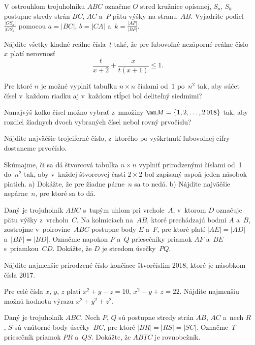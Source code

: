 {%
V ostrouhlom trojuholníku $ABC$ označme $O$ stred
kružnice opísanej, $S_a$, $S_b$ postupne stredy strán $BC$, $AC$
a~$P$ pätu výšky na stranu~$AB$. Vyjadrite podiel $\frac{|OS_a|}{|OS_b|}$
pomocou $a=|BC|$, $ b=|CA|$ a~$k=\frac{|AP|}{|BP|}$.}

{%
Nájdite všetky kladné reálne čísla~$t$ také, že pre
ľubovoľné nezáporné reálne číslo~$x$ platí nerovnosť
$$
\frac t{x+2}+\frac x{t(x+1)}\le 1.
$$}

{%
Pre ktoré $n$ je možné vyplniť tabuľku $n\times n$ číslami od~$1$ po~$n^2$
tak, aby súčet čísel v~každom riadku aj v~každom stĺpci bol deliteľný siedmimi?}

{%
Nanajvýš koľko čísel možno vybrať z~množiny
$\mn M=\{1,2,\dots,2\,018\}$ tak, aby rozdiel žiadnych dvoch vybraných čísel
nebol rovný prvočíslu?}

{%
Nájdite najväčšie trojciferné číslo, z~ktorého po vyškrtnutí
ľubovoľnej cifry dostaneme prvočíslo.}

{%
Skúmajme, či sa dá štvorcová tabuľka
$n\times n$ vyplniť prirodzenými číslami od~1 do~$n^2$ tak, aby v~každej
štvorcovej časti $2\times2$ bol zapísaný aspoň jeden násobok piatich.
\ite a) Dokážte, že pre žiadne párne~$n$ sa to nedá.
\ite b) Nájdite najväčšie nepárne~$n$, pre ktoré sa to dá.}

{%
Daný je trojuholník $ABC$ s~tupým uhlom pri vrchole~$A$, v~ktorom $D$
označuje pätu výšky z~vrcholu~$C$. Na kolmiciach na~$AB$, ktoré prechádzajú
bodmi $A$ a~$B$, zostrojme v~polrovine~$ABC$
postupne body $E$ a~$F$, pre ktoré platí ${|AE|=|AD|}$
a~$|BF|=|BD|$. Označme napokon $P$ a~$Q$ priesečníky priamok $AF$ a~$BE$
s~priamkou~$CD$. Dokážte, že $D$ je stredom úsečky~$PQ$.}

{%
Nájdite najmenšie prirodzené číslo končiace štvorčíslím 2018, ktoré je
násobkom čísla 2017.}

{%
Pre celé čísla $x$, $y$, $z$ platí $x^2+y-z=10$, $x^2-y+z=22$.
Nájdite najmenšiu možnú hodnotu výrazu $x^2+y^2+z^2$.}

{%
Daný je trojuholník $ABC$. Nech $P$, $Q$ sú postupne stredy strán $AB$, $AC$ a~nech
$R$, $S$ sú vnútorné body úsečky~$BC$, pre ktoré $|BR|=|RS|=|SC|$. Označme~$T$
priesečník priamok $PR$ a~$QS$. Dokážte, že $ABTC$ je rovnobežník.}

